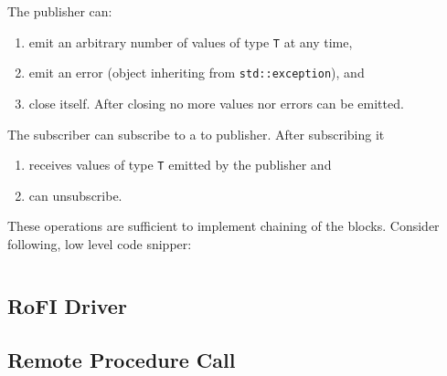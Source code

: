 \noindent The publisher can:
\begin{enumerate}
    \item emit an arbitrary number of values of type \texttt{T} at any time,
    \item emit an error (object inheriting from
    \texttt{std::exception}), and
    \item close itself. After closing no more values nor errors can be emitted.
\end{enumerate}

\noindent The subscriber can subscribe to a to publisher. After subscribing it
\begin{enumerate}
    \item receives values of type \texttt{T} emitted by the publisher and
    \item can unsubscribe.
\end{enumerate}

These operations are sufficient to implement chaining of the blocks. Consider
following, low level code snipper:
\begin{verbatim}

\end{verbatim}


\subsection{RoFI Driver}

\subsection{Remote Procedure Call}